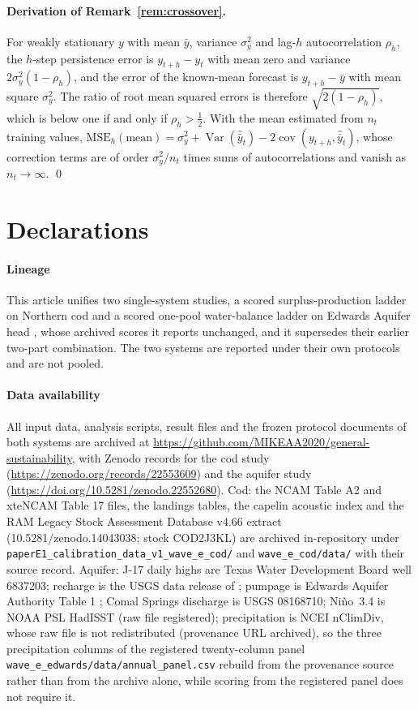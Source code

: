 \documentclass[preprint,11pt,authoryear]{elsarticle}
\theoremstyle{definition}
\theoremstyle{remark}
\newcommand{\MSE}{\mathrm{MSE}}
\begin{document}
\paragraph{Derivation of Remark~\ref{rem:crossover}.} For weakly stationary $y$ with mean $\bar y$, variance $\sigma_y^2$ and lag-$h$ autocorrelation $\rho_h$, the $h$-step persistence error is $y_{t+h}-y_t$ with mean zero and variance $2\sigma_y^2(1-\rho_h)$, and the error of the known-mean forecast is $y_{t+h}-\bar y$ with mean square $\sigma_y^2$. The ratio of root mean squared errors is therefore $\sqrt{2(1-\rho_h)}$, which is below one if and only if $\rho_h>\tfrac12$. With the mean estimated from $n_t$ training values, $\MSE_h(\mathrm{mean}) = \sigma_y^2 + \operatorname{Var}(\hat{\bar y}_t) - 2\operatorname{cov}(y_{t+h},\hat{\bar y}_t)$, whose correction terms are of order $\sigma_y^2/n_t$ times sums of autocorrelations and vanish as $n_t\to\infty$. \qed

\section*{Declarations}

\paragraph{Lineage} This article unifies two single-system studies, a scored surplus-production ladder on Northern cod \citep{Abaee2026cod} and a scored one-pool water-balance ladder on Edwards Aquifer head \citep{Abaee2026edwards}, whose archived scores it reports unchanged, and it supersedes their earlier two-part combination. The two systems are reported under their own protocols and are not pooled.

\paragraph{Data availability} All input data, analysis scripts, result files and the frozen protocol documents of both systems are archived at \url{https://github.com/MIKEAA2020/general-sustainability}, with Zenodo records for the cod study (\url{https://zenodo.org/records/22553609}) and the aquifer study (\url{https://doi.org/10.5281/zenodo.22552680}). Cod: the NCAM Table A2 and xteNCAM Table 17 files, the landings tables, the capelin acoustic index and the RAM Legacy Stock Assessment Database v4.66 extract (10.5281/zenodo.14043038; stock COD2J3KL) are archived in-repository under \texttt{paperE1\_calibration\_data\_v1\_wave\_e\_cod/} and \texttt{wave\_e\_cod/data/} with their source record. Aquifer: J-17 daily highs are Texas Water Development Board well 6837203; recharge is the USGS data release of \citet{UmphresChoi2025}; pumpage is Edwards Aquifer Authority Table 1 \citep{EAA2024}; Comal Springs discharge is USGS 08168710; Ni\~no~3.4 is NOAA PSL HadISST (raw file registered); precipitation is NCEI nClimDiv, whose raw file is not redistributed (provenance URL archived), so the three precipitation columns of the registered twenty-column panel \texttt{wave\_e\_edwards/data/annual\_panel.csv} rebuild from the provenance source rather than from the archive alone, while scoring from the registered panel does not require it.
\end{document}

